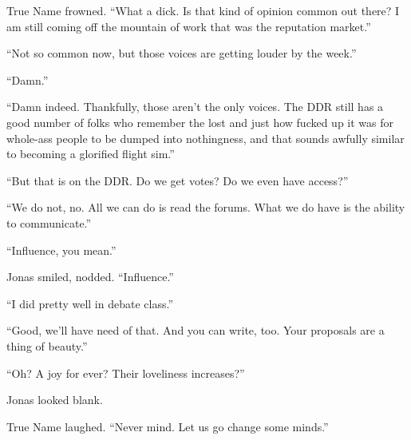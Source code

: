 True Name frowned. ``What a dick. Is that kind of opinion common out there? I am still coming off the mountain of work that was the reputation market.''

``Not so common now, but those voices are getting louder by the week.''

``Damn.''

``Damn indeed. Thankfully, those aren't the only voices. The DDR still has a good number of folks who remember the lost and just how fucked up it was for whole-ass people to be dumped into nothingness, and that sounds awfully similar to becoming a glorified flight sim.''

``But that is on the DDR. Do we get votes? Do we even have access?''

``We do not, no. All we can do is read the forums. What we do have is the ability to communicate.''

``Influence, you mean.''

Jonas smiled, nodded. ``Influence.''

``I did pretty well in debate class.''

``Good, we'll have need of that. And you can write, too. Your proposals are a thing of beauty.''

``Oh? A joy for ever? Their loveliness increases?''

Jonas looked blank.

True Name laughed. ``Never mind. Let us go change some minds.''
